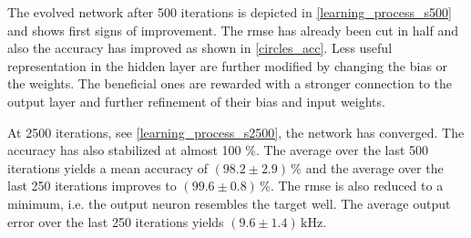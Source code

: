 The evolved network after 500 iterations is depicted in \cref{learning_process_s500} and shows first signs of improvement. The \gls{rmse} has already been cut in half and also the accuracy has improved as shown in \cref{circles_acc}. Less useful representation in the hidden layer are further modified by changing the bias or the weights. The beneficial ones are rewarded with a stronger connection to the output layer and further refinement of their bias and input weights.

At 2500 iterations, see \cref{learning_process_s2500}, the network has converged. The accuracy has also stabilized at almost 100 \%. The average over the last 500 iterations yields a mean accuracy of $(98.2 \pm 2.9)\,\%$ and the average over the last 250 iterations improves to  $(99.6 \pm 0.8)\,\%$. The \gls{rmse} is also reduced to a minimum, i.e. the output neuron resembles the target well. The average output error over the last 250 iterations yields $(9.6 \pm 1.4)\,\si{\kilo \Hz}$.


%    
